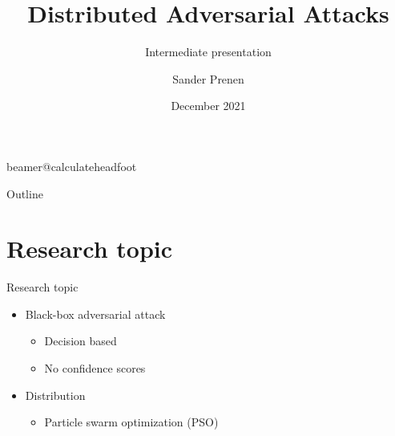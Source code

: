 \documentclass[11pt,t]{beamer}
\title[Distributed Adversarial Attacks]{Distributed Adversarial Attacks} %
\subtitle{Intermediate presentation}
\author{Sander Prenen}
\institute{KU Leuven}
\date{December 2021}
\begin{document}
\csname beamer@calculateheadfoot\endcsname %

\begin{frame}
	\titlepage
\end{frame}

\begin{frame}{Outline}
	\hfill	{\large \parbox{.961\textwidth}{\tableofcontents[hideothersubsections]}}
\end{frame}

\section{Research topic}
\begin{frame}{Research topic}
\begin{itemize}
	\item Black-box adversarial attack
	\begin{itemize}
		\item Decision based
		\item No confidence scores
	\end{itemize}

	\item Distribution
	\begin{itemize}
		\item Particle swarm optimization (PSO)
	\end{itemize}
\end{itemize}
\end{frame}
\end{document}
